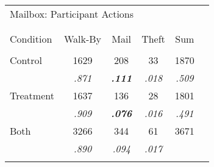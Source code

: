 \documentclass{standalone}
\begin{document}

\color[HTML]{342C5C}

\begin{tabular}{lccccc}
\multicolumn{5}{l}{Mailbox: Participant Actions}\\[-1.0ex] 
\\[-1.8ex]\hline 
\hline \\[-1.8ex]
Condition & Walk-By  & Mail    & Theft   & Sum     \\
\hline \\[-1.8ex] 
    Control     &  1629   & 208     &  33     & 1870\\
                &\textit{.871} &\textcolor{colred}{\textit{\textbf{.111}}} &\textit{.018} &\textit{.509} \\
    Treatment   &  1637   & 136     &  28     & 1801\\
                &\textit{.909} &\textcolor{colred}{\textit{\textbf{.076}}} &\textit{.016} &\textit{.491} \\
    Both        & 3266    & 344     & 61      & 3671  \\
                &\textit{.890} &\textit{.094} &\textit{.017} &         \\
\hline \\[-1.8ex]
\end{tabular}
\end{document}
